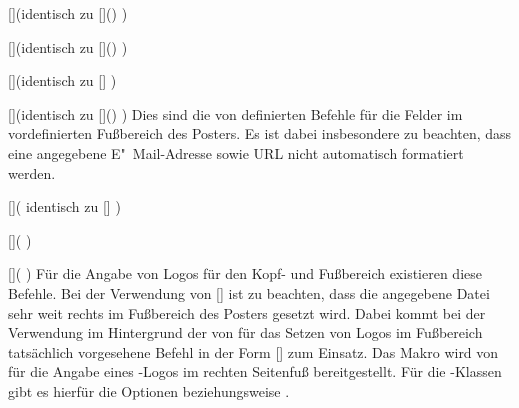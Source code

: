 \begin{Bundle*}{}
\begin{Declaration}{[]}(identisch zu 
  []()%
)
\begin{Declaration}{[]}(identisch zu 
  []()%
)
\begin{Declaration}{[]}(identisch zu 
  []%
)
\begin{Declaration}{[]}(identisch zu 
  []()%
)
\printdeclarationlist%
%
Dies sind die von  definierten Befehle für die Felder im 
vordefinierten Fußbereich des Posters. Es ist dabei insbesondere zu beachten, 
dass eine angegebene E"~Mail-Adresse sowie URL nicht automatisch formatiert 
werden.
\end{Declaration}
\end{Declaration}
\end{Declaration}
\end{Declaration}


\begin{Declaration}{[]}(%
  identisch zu []
)
\begin{Declaration}{[]}(%
)
\begin{Declaration}{[]}(%
)
\printdeclarationlist%
%
Für die Angabe von Logos für den Kopf- und Fußbereich existieren diese Befehle. 
Bei der Verwendung von [] ist zu 
beachten, dass die angegebene Datei sehr weit rechts im Fußbereich des Posters 
gesetzt wird. Dabei kommt bei der Verwendung im Hintergrund der von \TUDScript 
für das Setzen von Logos im Fußbereich tatsächlich vorgesehene Befehl in der 
Form []
zum Einsatz. Das Makro  wird von  für 
die Angabe eines \DDC-Logos im rechten Seitenfuß bereitgestellt. Für die 
\TUDScript-Klassen gibt es hierfür die Optionen  beziehungsweise 
.
\end{Declaration}
\end{Declaration}
\end{Declaration}


\end{Bundle*}
